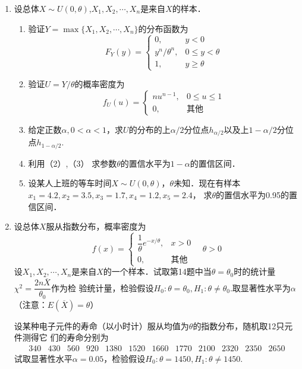 \documentclass[10pt,a4paper]{article}
\begin{document}
\begin{enumerate}
    \item 设总体$X\sim U(0,\theta)$,$X_1,X_2,\cdots,X_n$是来自$X$的样本．
    \begin{enumerate}
        \item 验证$Y=\max\{X_1,X_2,\cdots,X_n\}$的分布函数为
        $$F_Y(y)=\left\{\begin{array}{ll}
            0, & y<0\\
            y^n/\theta^n, & 0\leq y <\theta\\
            1, &  y\geq \theta
        \end{array}\right.$$
        \item 验证$U=Y/\theta$的概率密度为
        $$f_U(u)=\left\{\begin{array}{ll}
            nu^{n-1}, & 0\leq u \leq 1\\
            0, & \mbox{其他}
        \end{array}\right.$$
        \item 给定正数$\alpha,0<\alpha<1$，求$U$的分布的上$\alpha/2$分位点$h_{\alpha/2}$以及上$1-\alpha/2$分位点$h_{1-\alpha/2}$.
        \item 利用（2）,（3） 求参数$\theta$的置信水平为$1-\alpha$的置信区间．
        \item 设某人上班的等车时间$X\sim U(0,\theta)$，$\theta$未知．现在有样本$x_1=4.2,x_2=3.5,x_3=1.7,x_4=1.2,x_5=2.4$，
        求$\theta$的置信水平为0.95的置信区间．
    \end{enumerate}





    \item 设总体$X$服从指数分布，概率密度为
    $$f(x)=\left\{\begin{array}{ll}
        \dfrac{1}{\theta}e^{-x/\theta}, & x>0\\
        0, & \mbox{其他}
    \end{array}\right.\quad \theta>0$$
    设$X_1,X_2,\cdots,X_n$是来自$X$的一个样本．试取第14题中当$\theta=\theta_0$时的统计量$\chi^2=\dfrac{2n\overline{X}}{\theta_0}$作为检
    验统计量，检验假设$H_0:\theta=\theta_0,H_1:\theta\neq \theta_0$.取显著性水平为$\alpha$（注意：$E(\overline{X})=\theta$）

    设某种电子元件的寿命（以小时计）服从均值为$\theta$的指数分布，随机取12只元件测得它
    们的寿命分别为
    $$\begin{array}{cccccccccccc}
        340 & 430 & 560 & 920 & 1380 & 1520 & 1660 & 1770 & 2100 & 2320 & 2350 & 2650
    \end{array}$$
    试取显著性水平$\alpha=0.05$，检验假设$H_0:\theta=1450,H_1:\theta\neq 1450$.






\end{enumerate}
\end{document}
